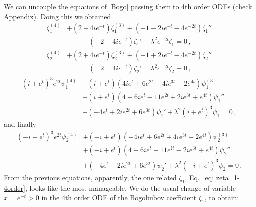 \documentclass[%
 aip,
 jmp,%
 amsmath,amssymb,
 reprint,%
]{revtex4-2}
\begin{document}
We can uncouple the equations of \eqref{Bogo} passing them to 4th order ODEs (check Appendix). Doing this we obtained
\begin{equation} \label{eq: zeta_1-4order}
    \begin{aligned}
        \zeta_1^{(4)} & + \left(2-4i e^{-t}\right)\zeta_1^{(3)} + \left(-1-2i e^{-t} - 4 e^{-2t}\right)\zeta_1''\\
        &\qquad  + \left(-2+4i e^{-t}\right)\zeta_1'  -\lambda^2 e^{-2t}\zeta_1=0\,,
    \end{aligned}
\end{equation}
\begin{equation*} %
    \begin{aligned}
        \zeta_2^{(4)} & + \left(2+4i e^{-t}\right)\zeta_2^{(3)}+ \left(-1+2i e^{-t} - 4 e^{-2t}\right)\zeta_2''\\
        & \qquad + \left(-2-4i e^{-t}\right)\zeta_2' -\lambda^2 e^{-2t}\zeta_2=0\,,
    \end{aligned}
\end{equation*}
\begin{equation*} 
    \begin{aligned}
        \left(i+ e^{t}\right)^3 e^{2t}\psi_1^{(4)} & + \left(i+e^t\right)\left(4i e^t + 6 e^{2t} - 4i e^{3t} - 2 e^{4t}\right)\psi_1^{(3)}\\
        & + \left(i+e^t\right)\left(4-6i e^t - 11 e^{2t} + 2i e^{3t} + e^{4t}\right)\psi_1''\\
        & + \left(-4 e^{t} + 2i e^{2t} + 6 e^{3t}\right)\psi_1' + \lambda^2\left(i+e^t\right)^3\psi_1=0\,,
    \end{aligned}
\end{equation*}
and finally
\begin{equation*} 
    \begin{aligned}
        \left(-i+ e^{t}\right)^3 e^{2t}\psi_2^{(4)} & + \left(-i+e^t\right)\left(-4i e^{t}+6e^{2t}+4i e^{3t} - 2 e^{4t}\right)\psi_2^{(3)}\\
        & + \left(-i+e^t\right)\left(4 + 6i e^{t} - 11 e^{2t} - 2i e^{3t}+e^{4t}\right)\psi_2''\\
        & + \left(-4 e^{t}-2i e^{2t}+6 e^{3t}\right)\psi_2'  +\lambda^2\left(-i+e^t\right)^3\psi_2=0\,.
    \end{aligned}
\end{equation*}
From the previous equations, apparently, the one related $\zeta_1$, Eq.~\eqref{eq: zeta_1-4order}, looks like the most manageable. We do the usual change of variable $x=e^{-t}>0$ in the 4th order ODE of the Bogoliubov coefficient $\zeta_1$, to obtain:
\end{document}
